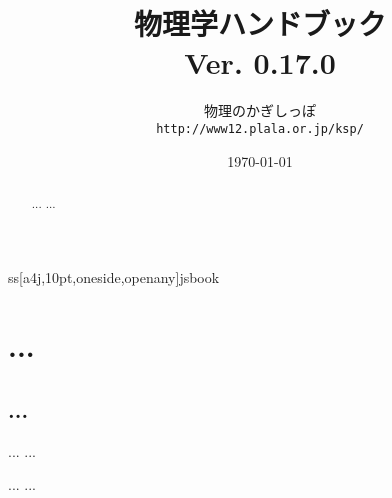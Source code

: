 ss[a4j,10pt,oneside,openany]{jsbook}
%
\usepackage{amsmath,amssymb}
\usepackage{bm}
\usepackage{graphicx}
\usepackage{ascmac}
\usepackage{makeidx}
%
\makeindex
%
\newcommand{\diff}{\mathrm{d}}  %
\newcommand{\divergence}{\mathrm{div}\,}  %
\newcommand{\grad}{\mathrm{grad}\,}  %
\newcommand{\rot}{\mathrm{rot}\,}  %
%
\setlength{\textwidth}{\fullwidth}
\setlength{\textheight}{44\baselineskip}
\addtolength{\textheight}{\topskip}
\setlength{\voffset}{-0.6in}
%
\title{{\Huge \textbf{物理学ハンドブック}}\\ {\small Ver. 0.17.0}}
\author{物理のかぎしっぽ\\ \texttt{http://www12.plala.or.jp/ksp/}}
\date{\today}

%
%
\maketitle
\frontmatter
\tableofcontents
%
%
\mainmatter

\chapter{...}
\begin{abstract}
...
...
\end{abstract}

\section{...}
...
...

\begin{thebibliography}{20}
 ...
  ...
  \end{thebibliography}

  \newpage
  \printindex
  
